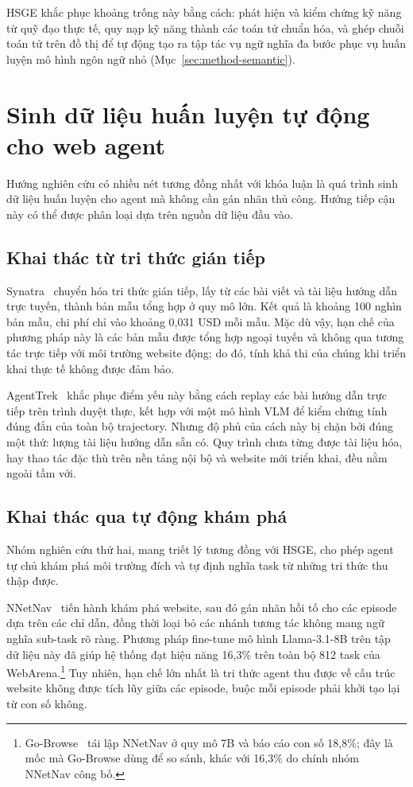 HSGE khắc phục khoảng trống này bằng cách: phát hiện và kiểm chứng kỹ năng từ quỹ đạo thực tế, quy nạp kỹ năng thành các toán tử chuẩn hóa, và ghép chuỗi toán tử trên đồ thị để tự động tạo ra tập tác vụ ngữ nghĩa đa bước phục vụ huấn luyện mô hình ngôn ngữ nhỏ (Mục~\ref{sec:method-semantic}).

\section{Sinh dữ liệu huấn luyện tự động cho web agent}
\label{sec:rel-datagen}

Hướng nghiên cứu có nhiều nét tương đồng nhất với khóa luận là quá trình sinh dữ liệu huấn luyện cho agent mà không cần gán nhãn thủ công. Hướng tiếp cận này có thể được phân loại dựa trên nguồn dữ liệu đầu vào.

\subsection{Khai thác từ tri thức gián tiếp}

Synatra~\cite{ou2024synatra} chuyển hóa tri thức gián tiếp, lấy từ các bài viết và tài liệu hướng dẫn trực tuyến, thành bản mẫu tổng hợp ở quy mô lớn. Kết quả là khoảng 100 nghìn bản mẫu, chi phí chỉ vào khoảng 0{,}031 USD mỗi mẫu. Mặc dù vậy, hạn chế của phương pháp này là các bản mẫu được tổng hợp ngoại tuyến và không qua tương tác trực tiếp với môi trường website động; do đó, tính khả thi của chúng khi triển khai thực tế không được đảm bảo.

AgentTrek~\cite{xu2024agenttrek} khắc phục điểm yếu này bằng cách replay các bài hướng dẫn trực tiếp trên trình duyệt thực, kết hợp với một mô hình VLM để kiểm chứng tính đúng đắn của toàn bộ trajectory. Nhưng độ phủ của cách này bị chặn bởi đúng một thứ: lượng tài liệu hướng dẫn sẵn có. Quy trình chưa từng được tài liệu hóa, hay thao tác đặc thù trên nền tảng nội bộ và website mới triển khai, đều nằm ngoài tầm với.

\subsection{Khai thác qua tự động khám phá}

Nhóm nghiên cứu thứ hai, mang triết lý tương đồng với HSGE, cho phép agent tự chủ khám phá môi trường đích và tự định nghĩa task từ những tri thức thu thập được.

NNetNav~\cite{murty2024nnetnav} tiến hành khám phá website, sau đó gán nhãn hồi tố cho các episode dựa trên các chỉ dẫn, đồng thời loại bỏ các nhánh tương tác không mang ngữ nghĩa sub-task rõ ràng. Phương pháp fine-tune mô hình Llama-3.1-8B trên tập dữ liệu này đã giúp hệ thống đạt hiệu năng 16{,}3\% trên toàn bộ 812 task của WebArena.\footnote{Go-Browse~\cite{gandhi2026gobrowse} tái lập NNetNav ở quy mô 7B và báo cáo con số 18{,}8\%; đây là mốc mà Go-Browse dùng để so sánh, khác với 16{,}3\% do chính nhóm NNetNav công bố.} Tuy nhiên, hạn chế lớn nhất là tri thức agent thu được về cấu trúc website không được tích lũy giữa các episode, buộc mỗi episode phải khởi tạo lại từ con số không.

